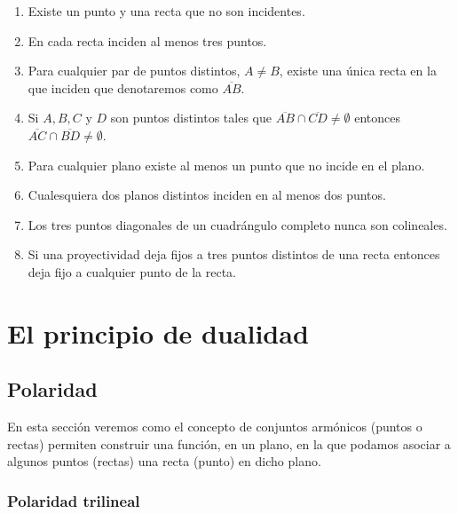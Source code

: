\documentclass[12pt]{book}
\theoremstyle{definition}
\begin{document}
\begin{enumerate}[label=\bf{Ax.\arabic*}]

\item \label{A1} Existe un punto y una recta que no son incidentes.

\item \label{A2} En cada recta inciden al menos tres puntos.

\item \label{A3} Para cualquier par de puntos distintos, $A \neq B$, existe una única recta en la que inciden que denotaremos como $\overline{AB}$.

\item \label{A4} Si $A,B,C$ y $D$ son puntos distintos tales que $\overline{AB} \cap \overline{CD} \neq \emptyset$ entonces $\overline{AC} \cap \overline{BD} \neq \emptyset$.

\item \label{A5} Para cualquier plano existe al menos un punto que no incide en el plano.

\item \label{A6} Cualesquiera dos planos distintos inciden en al menos dos puntos.

\item \label{A7} Los tres puntos diagonales de un cuadrángulo completo nunca son colineales.

\item \label{A8} Si una proyectividad deja fijos a tres puntos distintos de una recta entonces deja fijo a cualquier punto de la recta.

\end{enumerate}


\chapter{El principio de dualidad}

\section{Polaridad}

En esta sección veremos como el concepto de conjuntos armónicos (puntos o rectas) permiten construir una función, en un plano, en la que podamos asociar a algunos puntos (rectas) una recta (punto) en dicho plano.\\

\subsection{Polaridad trilineal}
\end{document}
